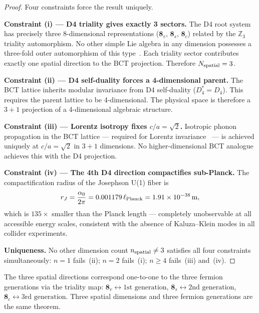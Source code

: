 \documentclass[aps,prl,twocolumn,showpacs,superscriptaddress]{revtex4-2}
\begin{document}
\begin{proof}
Four constraints force the result uniquely.

\textbf{Constraint (i) --- D4 triality gives exactly 3 sectors.}
The D4 root system has precisely three 8-dimensional representations
($\mathbf{8}_v$, $\mathbf{8}_s$, $\mathbf{8}_c$) related by the
$\mathbb{Z}_3$ triality automorphism. No other simple Lie algebra in
any dimension possesses a three-fold outer automorphism of this
type~\cite{L4}. Each triality sector contributes exactly one spatial
direction to the BCT projection. Therefore $N_{\rm spatial} = 3$.

\textbf{Constraint (ii) --- D4 self-duality forces a 4-dimensional
parent.} The BCT lattice inherits modular invariance from D4
self-duality ($D_4^* = D_4$). This requires the parent lattice to be
4-dimensional. The physical space is therefore a $3{+}1$ projection of
a 4-dimensional algebraic structure.

\textbf{Constraint (iii) --- Lorentz isotropy fixes $c/a = \sqrt{2}$.}
Isotropic phonon propagation in the BCT lattice --- required for
Lorentz invariance~\cite{L1} --- is achieved uniquely at $c/a = \sqrt{2}$
in $3{+}1$ dimensions. No higher-dimensional BCT analogue achieves
this with the D4 projection.

\textbf{Constraint (iv) --- The 4th D4 direction compactifies
sub-Planck.} The compactification radius of the Josephson U(1) fiber is
\begin{equation}
  r_J = \frac{\alpha_0}{2\pi}
      = 0.001179\,\ell_{\rm Planck}
      = 1.91\times 10^{-38}\,\text{m},
  \label{eq:rJ}
\end{equation}
which is $135\times$ smaller than the Planck length --- completely
unobservable at all accessible energy scales, consistent with the
absence of Kaluza--Klein modes in all collider experiments.

\textbf{Uniqueness.} No other dimension count $n_{\rm spatial} \neq 3$
satisfies all four constraints simultaneously: $n=1$ fails~(ii);
$n=2$ fails~(i); $n \geq 4$ fails~(iii) and~(iv).
\end{proof}

\begin{corollary}
The three spatial directions correspond one-to-one to the three fermion
generations via the triality map:
$\mathbf{8}_v \leftrightarrow \text{1st generation}$,
$\mathbf{8}_s \leftrightarrow \text{2nd generation}$,
$\mathbf{8}_c \leftrightarrow \text{3rd generation}$.
Three spatial dimensions and three fermion generations are the same
theorem.
\end{corollary}
\end{document}

